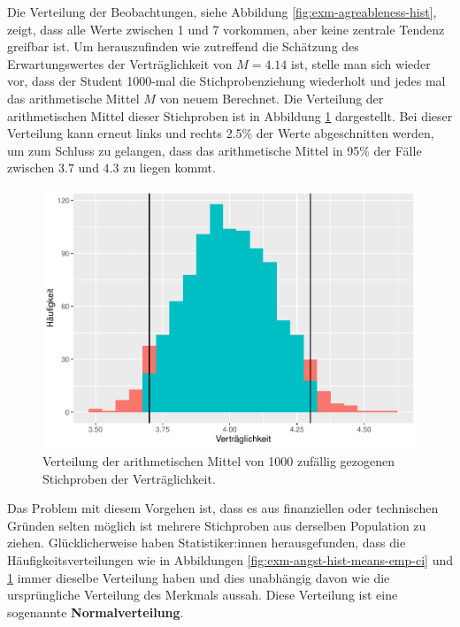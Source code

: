 \documentclass[
]{book}
\theoremstyle{definition}
\theoremstyle{definition}
\theoremstyle{definition}
\theoremstyle{definition}
\theoremstyle{remark}
\begin{document}
Die Verteilung der Beobachtungen, siehe Abbildung \ref{fig:exm-agreableness-hist}, zeigt, dass alle Werte zwischen 1 und 7 vorkommen, aber keine zentrale Tendenz greifbar ist. Um herauszufinden wie zutreffend die Schätzung des Erwartungswertes der Verträglichkeit von \(M=4.14\) ist, stelle man sich wieder vor, dass der Student 1000-mal die Stichprobenziehung wiederholt und jedes mal das arithmetische Mittel \(M\) von neuem Berechnet. Die Verteilung der arithmetischen Mittel dieser Stichproben ist in Abbildung \ref{fig:exm-agreableness-hist-means} dargestellt. Bei dieser Verteilung kann erneut links und rechts 2.5\% der Werte abgeschnitten werden, um zum Schluss zu gelangen, dass das arithmetische Mittel in 95\% der Fälle zwischen \(3.7\) und \(4.3\) zu liegen kommt.

\begin{figure}
\centering
\includegraphics{aps_statistik1_files/figure-latex/exm-agreableness-hist-means-1.pdf}
\caption{\label{fig:exm-agreableness-hist-means}Verteilung der arithmetischen Mittel von 1000 zufällig gezogenen Stichproben der Verträglichkeit.}
\end{figure}

Das Problem mit diesem Vorgehen ist, dass es aus finanziellen oder technischen Gründen selten möglich ist mehrere Stichproben aus derselben Population zu ziehen. Glücklicherweise haben Statistiker:innen herausgefunden, dass die Häufigkeitsverteilungen wie in Abbildungen \ref{fig:exm-angst-hist-means-emp-ci} und \ref{fig:exm-agreableness-hist-means} immer dieselbe Verteilung haben und dies unabhängig davon wie die ursprüngliche Verteilung des Merkmals aussah. \label{customdef-normalverteilung}{Diese Verteilung ist eine sogenannte \textbf{Normalverteilung}}.
\end{document}
